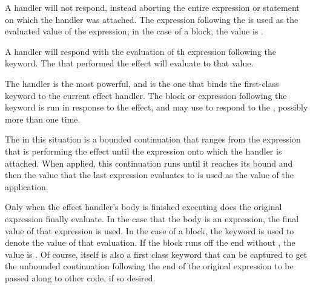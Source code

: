 A  handler will not respond, instead aborting the entire expression
or statement on which the handler was attached. The expression following the
 is used as the evaluated value of the expression; in the case of a
block, the value is .

A  handler will respond with the evaluation of th expression following
the keyword. The  that performed the effect will evaluate to that value.

The  handler is the most powerful, and is the one that binds the
first-class keyword  to the current effect handler. The block or expression
following the  keyword is run in response to the effect, and may use  to
respond to the , possibly more than one time.

The  in this situation is a bounded continuation that ranges from the
 expression that is performing the effect until the expression onto
which the handler is attached. When applied, this continuation runs until it reaches
its bound and then the value that the last expression evaluates to is used as the
value of the  application.

Only when the effect handler's body is finished executing does the original
expression finally evaluate. In the case that the body is an expression, the
final value of that expression is used. In the case of a block, the 
keyword is used to denote the value of that evaluation. If the block runs off
the end without , the value is . Of course,  itself
is also a first class keyword that can be captured to get the unbounded continuation
following the end of the original expression to be passed along to other code, if
so desired.
